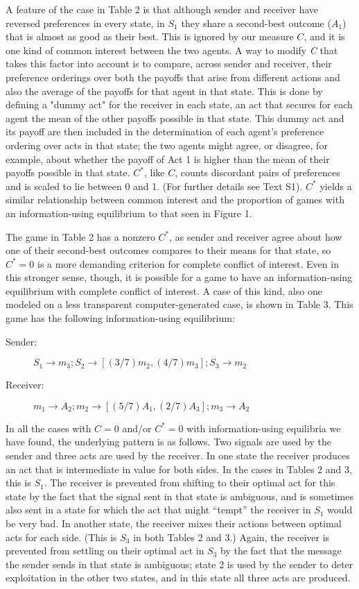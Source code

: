 \documentclass[10pt]{article}
\begin{document}
A feature of the case in Table 2 is that although sender and receiver
have reversed preferences in every state, in $S_1$ they share a second-best
outcome ($A_1$) that is almost as good as their best. This is ignored by
our measure $C$, and it is one kind of common interest between the two
agents. A way to modify \emph{C} that takes this factor into account is
to compare, across sender and receiver, their preference orderings over
both the payoffs that arise from different actions and also the average
of the payoffs for that agent in that state. This is done by defining a "dummy act" for the receiver in each state, an act that secures for each agent the mean of the other payoffs possible in that state. This dummy act and its payoff are then included in the determination of each agent's preference ordering over acts in that state; the two agents might agree, or disagree, for example, about whether the payoff of Act 1 is higher than the mean of their payoffs possible in that state. $C^*$, like $C$, counts discordant pairs of preferences and is scaled to lie between 0 and 1. (For further details see Text S1).  $C^*$ yields
a similar relationship between common interest and the proportion of
games with an information-using equilibrium to that seen in Figure 1.

The game in Table 2 has a nonzero $C^*$, as sender and receiver
agree about how one of their second-best outcomes compares to their
means for that state, so $C^*=0$ is a more demanding criterion for
complete conflict of interest. Even in this stronger sense, though, it
is possible for a game to have an information-using equilibrium with
complete conflict of interest. A case of this kind, also one modeled on
a less transparent computer-generated case, is shown in Table 3. This
game has the following information-using equilibrium:

\begin{description}
\item[Sender:]
$S_1\rightarrow m_3; S_2\rightarrow [(3/7) m_2, (4/7) m_3]; S_3\rightarrow m_2$
\item[Receiver:]
$m_1\rightarrow A_2; m_2\rightarrow [(5/7)A_1, (2/7)A_3]; m_3\rightarrow A_2$
\end{description}

In all the cases with $C=0$ and/or $C^*=0$ with information-using
equilibria we have found, the underlying pattern is as follows. Two
signals are used by the sender and three acts are used by the receiver.
In one state the receiver produces an act that is intermediate in value
for both sides. In the cases in Tables 2 and 3, this is $S_1$. The receiver is
prevented from shifting to their optimal act for this state by the fact
that the signal sent in that state is ambiguous, and is sometimes also
sent in a state for which the act that might ``tempt'' the receiver in
$S_1$ would be very bad. In another state, the receiver mixes their actions
between optimal acts for each side. (This is $S_3$ in both Tables
2 and 3.) Again, the receiver is prevented from settling on their optimal act
in $S_3$ by the fact that the message the sender sends in that state is
ambiguous; state 2 is used by the sender to deter exploitation in the
other two states, and in this state all three acts are produced.
\end{document}
